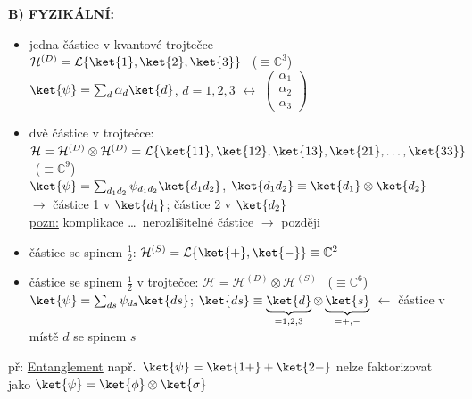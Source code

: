 \documentclass[11pt,a4paper]{article}
\begin{document}
\textbf{B) FYZIKÁLNÍ:}
\begin{itemize}
  \item jedna částice v kvantové trojtečce
         \\
        $\mathcal{H}^{(D)} = \mathcal{L}\{\ket{1},\ket{2},\ket{3}\}$ \ ($\equiv\mathbb{C}^3$) \\
        \quad $\ket{\psi} = \sum_d\alpha_d\ket{d}$, \quad $d = 1,2,3$ \quad $\longleftrightarrow$ \quad
        $\begin{pmatrix}\alpha_1\\ \alpha_2\\ \alpha_3\end{pmatrix}$
  \item dvě částice v trojtečce: \\
        $\mathcal{H} = \mathcal{H}^{(D)}\otimes\mathcal{H}^{(D)} = \mathcal{L}\{\ket{11},\ket{12},\ket{13},\ket{21},\dots,\ket{33}\}$ \ ($\equiv\mathbb{C}^9$) \\
        \quad $\ket{\psi} = \sum_{d_1d_2}\psi_{d_1d_2}\ket{d_1d_2}$, \qquad $\ket{d_1d_2} \equiv \ket{d_1}\otimes\ket{d_2}$ \\
        \hspace*{6.2cm} $\to$ částice 1 v $\ket{d_1}$; částice 2 v $\ket{d_2}$ \\
        \underline{pozn:} komplikace \dots\ nerozlišitelné částice $\to$ později
  \item částice se spinem $\frac12$: \quad $\mathcal{H}^{(S)} = \mathcal{L}\{\ket{+},\ket{-}\} \equiv \mathbb{C}^2$
  \item částice se spinem $\frac12$ v trojtečce: \quad $\mathcal{H} = \mathcal{H}^{(D)}\otimes\mathcal{H}^{(S)}$ \ ($\equiv\mathbb{C}^6$) \\
        \quad $\ket{\psi} = \sum_{ds}\psi_{ds}\ket{ds}$; \qquad
        $\ket{ds} \equiv \underbrace{\ket{d}}_{=1,2,3}\otimes\underbrace{\ket{s}}_{=+,-}$
        \quad $\leftarrow$ částice v místě $d$ se spinem $s$
\end{itemize}

př: \underline{Entanglement} \quad např.\ $\ket{\psi} = \ket{1+} + \ket{2-}$ nelze faktorizovat \\
\quad jako \quad $\ket{\psi} = \ket{\phi}\otimes\ket{\sigma}$ \qquad {}

\end{document}
